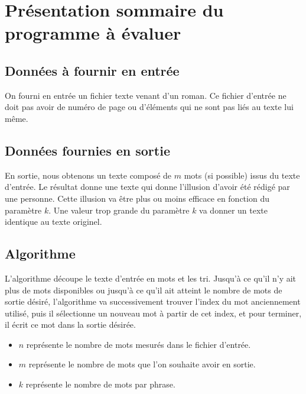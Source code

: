 
\section{Présentation sommaire du programme à évaluer}

\subsection{Données à fournir en entrée}

On fourni en entrée un fichier texte venant d'un roman.
Ce fichier d'entrée ne doit pas avoir de numéro de page ou d'éléments qui ne sont pas liés au texte lui même.

\subsection{Données fournies en sortie}

En sortie, nous obtenons un texte composé de $m$ mots (si possible) issus du texte d'entrée.
Le résultat donne une texte qui donne l'illusion d'avoir été rédigé par une personne.
Cette illusion va être plus ou moins efficace en fonction du paramètre $k$.
Une valeur trop grande du paramètre $k$ va donner un texte identique au texte originel.

\subsection{Algorithme}


L'algorithme découpe le texte d'entrée en mots et les tri.
Jusqu'à ce qu'il n'y ait plus de mots disponibles ou jusqu'à ce qu'il ait atteint le nombre de mots de sortie désiré, l'algorithme va successivement trouver l'index du mot anciennement utilisé, puis il sélectionne un nouveau mot à partir de cet index, et pour terminer, il écrit ce mot dans la sortie désirée.



\begin{itemize}
	\item $n$ représente le nombre de mots mesurés dans le fichier d'entrée.
	\item $m$ représente le nombre de mots que l'on souhaite avoir en sortie.
	\item $k$ représente le nombre de mots par phrase.
\end{itemize}

